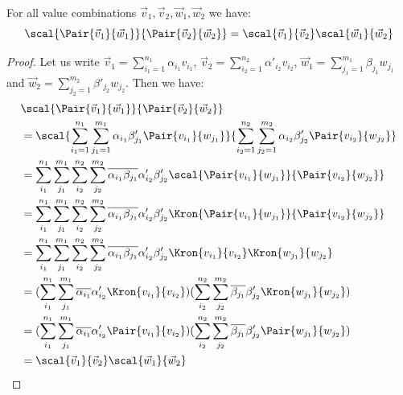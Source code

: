 \begin{theorem}\label{prop:InnerProdPairs} For all value combinations $\vec{v}_{1}, \vec{v}_{2}, \vec{w}_{1}, \vec{w}_{2}$ we have:
\[
\scal{\Pair{\vec{v}_{1}}{\vec{w}_{1}}}{\Pair{\vec{v}_{2}}{\vec{w}_{2}}} = \scal{\vec{v}_{1}}{\vec{v}_{2}}\scal{\vec{w}_{1}}{\vec{w}_{2}}
\]
\begin{proof}
    Let us write $\vec{v}_{1}=\sum_{i_1=1}^{n_1}\alpha_{i_1} v_{i_1}$, $\vec{v}_{2}=\sum_{i_2=1}^{n_2}\alpha'_{i_2} v_{i_2}$, $\vec{w}_{1}=\sum_{j_1=1}^{m_1}\beta_{j_1} w_{j_1}$ and $\vec{w}_{2}=\sum_{j_2=1}^{m_2}\beta'_{j_2} w_{j_2}$. Then we have:
    \begin{align*}
        &\scal{\Pair{\vec{v}_{1}}{\vec{w}_{1}}}{\Pair{\vec{v}_{2}}{\vec{w}_{2}}}\\
        &=\scal{\sum_{i_1=1}^{n_1}\sum_{j_1=1}^{m_1} \alpha_{i_1}\beta'_{j_1}\Pair{v_{i_1}}{w_{j_1}}}{\sum_{i_2=1}^{n_2}\sum_{j_2=1}^{m_2} \alpha_{i_2}\beta'_{j_2}\Pair{v_{i_2}}{w_{j_2}}}\\
        &=\sum_{i_1}^{n_1}\sum_{j_1}^{m_1}\sum_{i_2}^{n_2}\sum_{j_2}^{m_2} \overline{\alpha_{i_1}\beta_{j_1}} \alpha'_{i_2}\beta'_{j_2} \scal{\Pair{v_{i_1}}{w_{j_1}}}{\Pair{v_{i_2}}{w_{j_2}}}\\
        &=\sum_{i_1}^{n_1}\sum_{j_1}^{m_1}\sum_{i_2}^{n_2}\sum_{j_2}^{m_2} \overline{\alpha_{i_1}\beta_{j_1}} \alpha'_{i_2}\beta'_{j_2} \Kron{\Pair{v_{i_1}}{w_{j_1}}}{\Pair{v_{i_2}}{w_{j_2}}}\\
        &=\sum_{i_1}^{n_1}\sum_{j_1}^{m_1}\sum_{i_2}^{n_2}\sum_{j_2}^{m_2} \overline{\alpha_{i_1}\beta_{j_1}} \alpha'_{i_2}\beta'_{j_2} \Kron{v_{i_1}}{v_{i_2}}\Kron{w_{j_1}}{w_{j_2}}\\
        &=(\sum_{i_1}^{n_1}\sum_{j_1}^{m_1}\overline{\alpha_{i_1}}\alpha'_{i_2}\Kron{v_{i_1}}{v_{i_2}})(\sum_{i_2}^{n_2}\sum_{j_2}^{m_2} \overline{\beta_{j_1}} \beta'_{j_2} \Kron{w_{j_1}}{w_{j_2}})\\
        &=(\sum_{i_1}^{n_1}\sum_{j_1}^{m_1}\overline{\alpha_{i_1}}\alpha'_{i_2}\Pair{v_{i_1}}{v_{i_2}})(\sum_{i_2}^{n_2}\sum_{j_2}^{m_2} \overline{\beta_{j_1}} \beta'_{j_2} \Pair{w_{j_1}}{w_{j_2}})\\
        &=\scal{\vec{v}_{1}}{\vec{v}_{2}}\scal{\vec{w}_{1}}{\vec{w}_{2}}
	\tag*{\qedhere}
    \end{align*}
\end{proof}  

\end{theorem}


